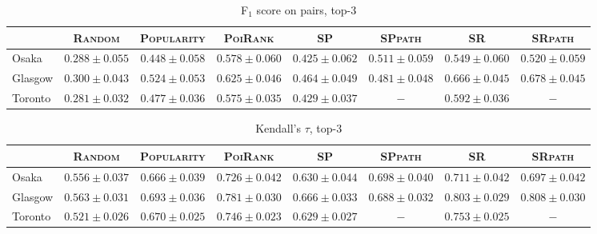 \begin{table*}[t]
\caption{F$_1$ score on pairs, top-3}
\centering
\small
\setlength{\tabcolsep}{4pt} %
\begin{tabular}{l|cc|cc|ccc} \hline
 & \textsc{Random} & \textsc{Popularity} & \textsc{PoiRank} & \textsc{SP} & \textsc{SPpath} & \textsc{SR} & \textsc{SRpath} \\ \hline
Osaka & $0.288\pm0.055$ & $0.448\pm0.058$ & $\mathbf{0.578\pm0.060}$ & $0.425\pm0.062$ & $0.511\pm0.059$ & $\mathit{0.549\pm0.060}$ & $0.520\pm0.059$ \\
Glasgow & $0.300\pm0.043$ & $0.524\pm0.053$ & $0.625\pm0.046$ & $0.464\pm0.049$ & $0.481\pm0.048$ & $\mathit{0.666\pm0.045}$ & $\mathbf{0.678\pm0.045}$ \\
Toronto & $0.281\pm0.032$ & $0.477\pm0.036$ & $\mathit{0.575\pm0.035}$ & $0.429\pm0.037$ & $-$ & $\mathbf{0.592\pm0.036}$ & $-$ \\
\hline
\end{tabular}
\end{table*}

\begin{table*}[t]
\caption{Kendall's $\tau$, top-3}
\centering
\small
\setlength{\tabcolsep}{4pt} %
\begin{tabular}{l|cc|cc|ccc} \hline
 & \textsc{Random} & \textsc{Popularity} & \textsc{PoiRank} & \textsc{SP} & \textsc{SPpath} & \textsc{SR} & \textsc{SRpath} \\ \hline
Osaka & $0.556\pm0.037$ & $0.666\pm0.039$ & $\mathbf{0.726\pm0.042}$ & $0.630\pm0.044$ & $0.698\pm0.040$ & $\mathit{0.711\pm0.042}$ & $0.697\pm0.042$ \\
Glasgow & $0.563\pm0.031$ & $0.693\pm0.036$ & $0.781\pm0.030$ & $0.666\pm0.033$ & $0.688\pm0.032$ & $\mathit{0.803\pm0.029}$ & $\mathbf{0.808\pm0.030}$ \\
Toronto & $0.521\pm0.026$ & $0.670\pm0.025$ & $\mathit{0.746\pm0.023}$ & $0.629\pm0.027$ & $-$ & $\mathbf{0.753\pm0.025}$ & $-$ \\
\hline
\end{tabular}
\end{table*}

